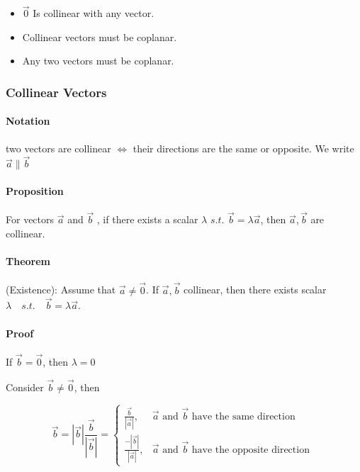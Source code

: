 \documentclass[UTF8]{ctexart}
\begin{document}
\begin{itemize}

\item $\vec 0 $ Is collinear with any vector. 
\item Collinear vectors must be coplanar.
\item Any two vectors must be coplanar.

\end{itemize}


\subsubsection{ Collinear Vectors}


\paragraph{Notation}

 two vectors are collinear $\iff$ their directions are the same or opposite. We write $\vec a \parallel \vec b $

\paragraph{Proposition} 

For vectors $\vec a $ and $ \vec  b$ , if there exists a scalar $\lambda$ $s.t.$  $\vec b = \lambda \vec a $, then $\vec a , \vec b $ are collinear.

\paragraph{Theorem}

(Existence): Assume that $\vec a \neq \vec 0$. If $\vec a, \vec b  $ collinear, then there exists scalar $\lambda \quad s.t. \quad  \vec b = \lambda \vec a $.

\paragraph{Proof}

 If $\vec b = \vec 0 $, then $\lambda =0$

Consider $\vec b \neq \vec 0 $, then 

$$
\vec{b}=|\vec{b}| \frac{\vec{b}}{|\vec{b}|}=\left\{\begin{array}{ll}
\frac{\vec{b}}{|\vec{a}|}, & \vec{a} \text { and } \vec{b} \text { have the same direction } \\
\frac{-|\vec{b}|}{|\vec{a}|}, & \vec{a} \text { and } \vec{b} \text { have the opposite direction }
\end{array}\right.
$$
\end{document}
